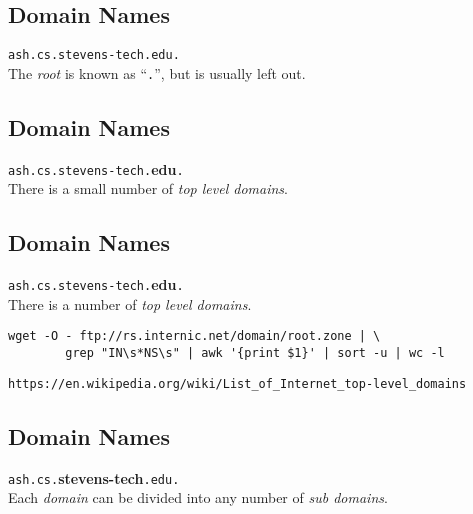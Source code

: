 \documentclass[xga]{xdvislides}
\begin{document}
\subsection{Domain Names}
\vspace{.5in}
\begin{center}
	\Huge
	\verb+ash.cs.stevens-tech.edu.+ \\
	\vspace{.5in}
	The {\em root} is known as ``\verb+.+'', but is usually left out.
\end{center}
\Normalsize

\subsection{Domain Names}
\vspace{.5in}
\begin{center}
	\Huge
	\verb+ash.cs.stevens-tech.+{\bf edu}\verb+.+ \\
	\vspace{.5in}
	There is a small number of {\em top level domains}.
\end{center}
\Normalsize

\subsection{Domain Names}
\vspace{.5in}
\begin{center}
	\Huge
	\verb+ash.cs.stevens-tech.+{\bf edu}\verb+.+ \\
	\vspace{.5in}
	There is a number of {\em top level domains}. \\
	\vspace{.5in}
	\Normalsize
	\begin{verbatim}
wget -O - ftp://rs.internic.net/domain/root.zone | \
        grep "IN\s*NS\s" | awk '{print $1}' | sort -u | wc -l
\end{verbatim}
	\vspace{.25in}
	\verb+https://en.wikipedia.org/wiki/List_of_Internet_top-level_domains+
\end{center}
\Normalsize


\subsection{Domain Names}
\vspace{.5in}
\begin{center}
	\Huge
	\verb+ash.cs.+{\bf stevens-tech}\verb+.edu.+ \\
	\vspace{.5in}
	Each {\em domain} can be divided into any number of {\em sub domains}.
\end{center}
\Normalsize
\end{document}

